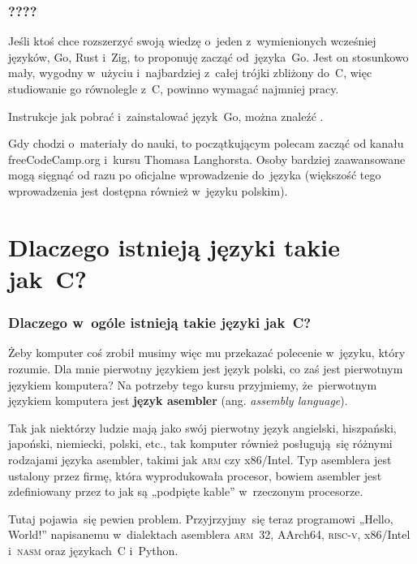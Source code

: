 \documentclass[10pt,t]{beamer}
\begin{document}
\begin{frame}
  \frametitle{????}


  Jeśli ktoś chce rozszerzyć swoją wiedzę o~jeden z~wymienionych wcześniej
  języków, Go, Rust i~Zig, to proponuję zacząć od~języka~Go. Jest on
  stosunkowo mały, wygodny w~użyciu i~najbardziej z~całej trójki zbliżony
  do~C, więc studiowanie go równolegle z~C, powinno wymagać najmniej pracy.

  Instrukcje jak pobrać i~zainstalować język~Go, można znaleźć
  .

  Gdy chodzi o~materiały do nauki, to początkującym polecam zacząć od
   kanału freeCodeCamp.org
  i~kursu
   Thomasa Langhorsta. Osoby bardziej
  zaawansowane mogą sięgnąć od razu po oficjalne wprowadzenie do~języka
  (większość tego wprowadzenia jest dostępna również w~języku polskim).

\end{frame}










\section{Dlaczego istnieją języki takie jak~C?}



\begin{frame}
  \frametitle{Dlaczego w~ogóle istnieją takie języki jak~C?}

  \pause


  Żeby komputer coś zrobił musimy więc mu przekazać polecenie w~języku,
  który rozumie. Dla mnie pierwotny językiem jest język polski, co zaś
  jest pierwotnym językiem komputera? Na potrzeby tego kursu przyjmiemy,
  że~pierwotnym językiem komputera jest \textbf{język asembler}
  (ang. \textit{assembly language}).

  Tak jak niektórzy ludzie mają jako swój pierwotny język angielski,
  hiszpański, japoński, niemiecki, polski, etc., tak komputer również
  posługują~się różnymi rodzajami języka asembler, takimi jak \textsc{arm}
  czy x86/Intel. Typ asemblera jest ustalony przez firmę, która
  wyprodukowała procesor, bowiem asembler jest zdefiniowany przez to jak są
  „podpięte kable” w~rzeczonym procesorze.

  Tutaj pojawia~się pewien problem. Przyjrzyjmy~się teraz programowi
  „Hello, World!” napisanemu w~dialektach asemblera \textsc{arm}~32,
  AArch64, \textsc{risc-v}, x86/Intel i~\textsc{nasm} oraz językach~C
  i~Python.

\end{frame}
\end{document}

